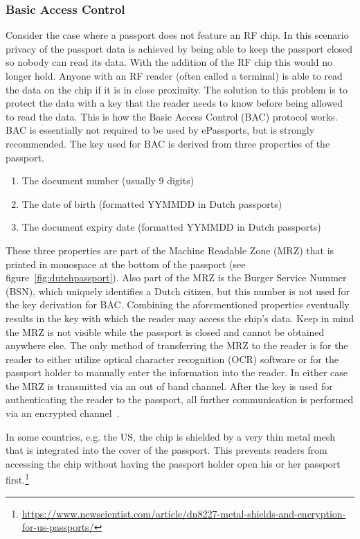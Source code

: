 \subsubsection{Basic Access Control}
Consider the case where a passport does not feature an RF chip. In this scenario privacy of the passport data is achieved by being able to keep the passport closed so nobody can read its data. With the addition of the RF chip this would no longer hold. Anyone with an RF reader (often called a terminal) is able to read the data on the chip if it is in close proximity. The solution to this problem is to protect the data with a key that the reader needs to know before being allowed to read the data. This is how the Basic Access Control (BAC) protocol works. BAC is essentially not required to be used by ePassports, but is strongly recommended. The key used for BAC is derived from three properties of the passport.
\begin{enumerate}
	\item The document number (usually 9 digits)
  \item The date of birth (formatted YYMMDD in Dutch passports)
  \item The document expiry date (formatted YYMMDD in Dutch passports)
\end{enumerate}
These three properties are part of the Machine Readable Zone (MRZ) that is printed in monospace at the bottom of the passport (see figure~\ref{fig:dutchpassport}). Also part of the MRZ is the Burger Service Nummer (BSN), which uniquely identifies a Dutch citizen, but this number is not used for the key derivation for BAC. Combining the aforementioned properties eventually results in the key with which the reader may access the chip's data. Keep in mind the MRZ is not visible while the passport is closed and cannot be obtained anywhere else. The only method of transferring the MRZ to the reader is for the reader to either utilize optical character recognition (OCR) software or for the passport holder to manually enter the information into the reader. In either case the MRZ is transmitted via an out of band channel. After the key is used for authenticating the reader to the passport, all further communication is performed via an encrypted channel~\cite{icao}.

In some countries, e.g. the US, the chip is shielded by a very thin metal mesh that is integrated into the cover of the passport. This prevents readers from accessing the chip without having the passport holder open his or her passport first.\footnote{\url{https://www.newscientist.com/article/dn8227-metal-shields-and-encryption-for-us-passports/}}


